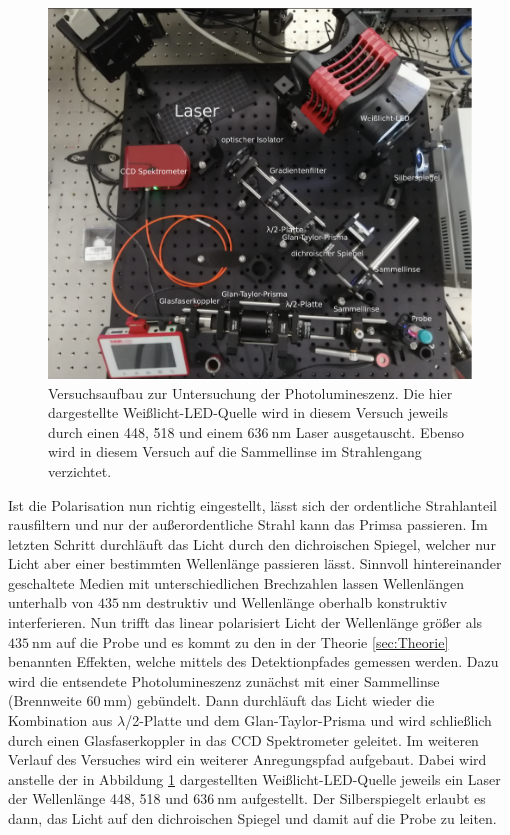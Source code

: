 \begin{figure}[hbtp]
	\centering
	\includegraphics[width=\textwidth]{Abb/aufbau.png}
	\caption{Versuchsaufbau \cite{flex} zur Untersuchung der Photolumineszenz. Die
    hier dargestellte Weißlicht-LED-Quelle wird in diesem Versuch jeweils durch einen
    448, 518 und einem $\SI{636}{\nano\meter}$ Laser ausgetauscht. Ebenso wird in diesem
    Versuch auf die Sammellinse im Strahlengang verzichtet.}
	\label{fig:aufbau}
\end{figure}
\noindent
Ist die Polarisation nun richtig eingestellt, lässt sich der ordentliche
Strahlanteil rausfiltern und nur der außerordentliche Strahl kann das Primsa
passieren. Im letzten Schritt durchläuft das Licht durch den dichroischen Spiegel,
welcher nur Licht aber einer bestimmten Wellenlänge passieren lässt. Sinnvoll hintereinander
geschaltete Medien mit unterschiedlichen Brechzahlen lassen Wellenlängen unterhalb von
$\SI{435}{\nano\meter}$ destruktiv und Wellenlänge oberhalb konstruktiv interferieren.
Nun trifft das linear polarisiert Licht der Wellenlänge größer als $\SI{435}{\nano\meter}$
auf die Probe und es kommt zu den in der Theorie \ref{sec:Theorie} benannten Effekten,
welche mittels des Detektionpfades gemessen werden. Dazu wird die entsendete
Photolumineszenz zunächst mit einer Sammellinse (Brennweite $\SI{60}{\milli\meter}$)
gebündelt. Dann durchläuft das Licht wieder die Kombination aus $\lambda$/2-Platte
und dem Glan-Taylor-Prisma und wird schließlich durch einen Glasfaserkoppler in das
CCD Spektrometer geleitet.
Im weiteren Verlauf des Versuches wird ein weiterer Anregungspfad aufgebaut. Dabei
wird anstelle der in Abbildung \ref{fig:aufbau} dargestellten Weißlicht-LED-Quelle
jeweils ein Laser der Wellenlänge 448, 518 und $\SI{636}{\nano\meter}$
aufgestellt. Der Silberspiegelt erlaubt es dann, das Licht auf den dichroischen Spiegel
und damit auf die Probe zu leiten.\\

